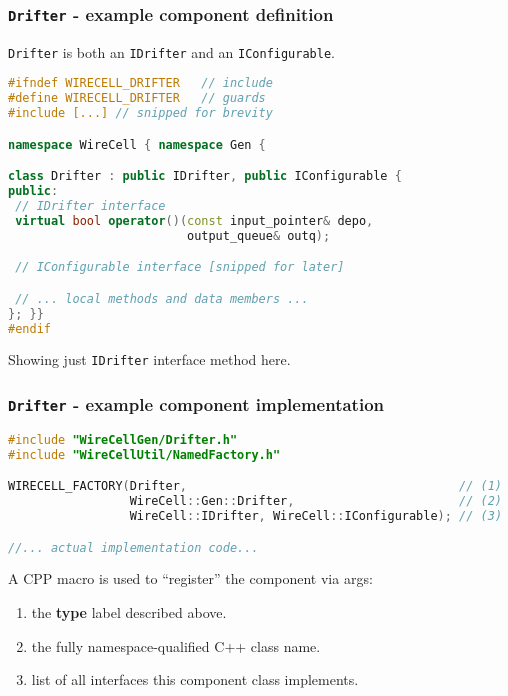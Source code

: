 \documentclass[xcolor=dvipsnames]{beamer}
\begin{document}
\begin{frame}[fragile]
  \frametitle{\texttt{Drifter} - example component definition}

  \texttt{Drifter} is both an \texttt{IDrifter} and an
  \texttt{IConfigurable}.

{
\scriptsize
\begin{lstlisting}[language=C++]
#ifndef WIRECELL_DRIFTER   // include 
#define WIRECELL_DRIFTER   // guards
#include [...] // snipped for brevity

namespace WireCell { namespace Gen {

class Drifter : public IDrifter, public IConfigurable {
public:
 // IDrifter interface
 virtual bool operator()(const input_pointer& depo,
                         output_queue& outq);

 // IConfigurable interface [snipped for later]

 // ... local methods and data members ...
}; }}
#endif
\end{lstlisting}
}

Showing just \texttt{IDrifter} interface method here.

\end{frame}

\begin{frame}[fragile]
  \frametitle{\texttt{Drifter} - example component implementation}


\begin{lstlisting}[language=C++]
#include "WireCellGen/Drifter.h"
#include "WireCellUtil/NamedFactory.h"

WIRECELL_FACTORY(Drifter,                                      // (1)
                 WireCell::Gen::Drifter,                       // (2)
                 WireCell::IDrifter, WireCell::IConfigurable); // (3)

//... actual implementation code...
\end{lstlisting}


A CPP macro is used to ``register'' the component via args:
\begin{enumerate}
\item the \textbf{type} label described above.
\item the fully namespace-qualified C++ class name.
\item list of all interfaces this component class implements.
\end{enumerate}

\end{frame}
\end{document}
